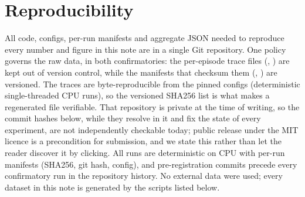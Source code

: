 \documentclass[11pt]{article}
\theoremstyle{definition}
\theoremstyle{remark}
\begin{document}
\section{Reproducibility}\label{sec:repro}

All code, configs, per-run manifests and aggregate JSON needed to reproduce every
number and figure in this note are in a single Git repository. One policy governs
the raw data, in both confirmatories: the per-episode trace files
(, ) are kept out of
version control, while the manifests that checksum them
(, ) are
versioned. The traces are byte-reproducible from the pinned configs
(deterministic single-threaded CPU runs), so the versioned SHA256 list is what
makes a regenerated file verifiable.
That repository is private at the time of writing, so the commit hashes below,
while they resolve in it and fix the state of every experiment, are not
independently checkable today; public release under the MIT licence is a
precondition for submission, and we state this rather than let the reader
discover it by clicking.
All runs are deterministic on CPU with per-run manifests (SHA256, git hash,
config), and pre-registration commits precede every confirmatory run in the
repository history. No external data were used; every dataset in this note is
generated by the scripts listed below.
\end{document}
